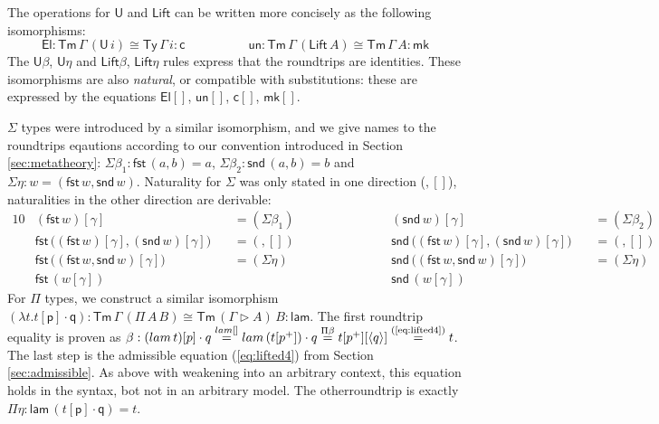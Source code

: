 \documentclass[a4paper,UKenglish,cleveref, autoref, thm-restate]{lipics-v2021}
\newcommand{\Ty}{\mathsf{Ty}}
\newcommand{\Tm}{\mathsf{Tm}}
\newcommand{\p}{\mathsf{p}}
\newcommand{\q}{\mathsf{q}}
\newcommand{\ext}{\mathop{\triangleright}}
\newcommand{\lam}{\mathsf{lam}}
\newcommand{\U}{\mathsf{U}}
\newcommand{\El}{\mathsf{El}}
\newcommand{\cd}{\mathsf{c}}
\newcommand{\fst}{\mathsf{fst}}
\newcommand{\snd}{\mathsf{snd}}
\newcommand{\Lift}{\mathsf{Lift}}
\newcommand{\mk}{\mathsf{mk}}
\newcommand{\un}{\mathsf{un}}
\begin{document}
The operations for $\U$ and $\Lift$ can be written more concisely as
the following isomorphisms:
\[
\El:\Tm\,\Gamma\,(\U\,i) \cong \Ty\,\Gamma\,i:\cd \hspace{5em} \un:\Tm\,\Gamma\,(\Lift\,A)\cong\Tm\,\Gamma\,A:\mk
\]
The $\U\beta$, $\U\eta$ and $\Lift\beta$, $\Lift\eta$ rules express
that the roundtrips are identities. These isomorphisms are also
\emph{natural}, or compatible with substitutions: these are expressed
by the equations $\El[]$, $\un[]$, $\cd[]$, $\mk[]$.

$\Sigma$ types were introduced by a similar isomorphism, and we give
names to the roundtrips eqautions according to our convention introduced in
Section \ref{sec:metatheory}: $\Sigma\beta_1 : \fst\,(a,b) = a$,
$\Sigma\beta_2 : \snd\,(a,b) = b$ and $\Sigma\eta : w =
(\fst\,w,\snd\,w)$. Naturality for $\Sigma$ was only stated in one
direction (${,}[]$), naturalities in the other direction are
derivable:
\begin{alignat*}{10}
  & (\fst\,w)[\gamma] && {=}(\Sigma\beta_1)                             && (\snd\,w)[\gamma] && {=}(\Sigma\beta_2)                             \\
  & \fst\,\big((\fst\,w)[\gamma],(\snd\,w)[\gamma]\big)\, && {=}({,}[]) \hspace{6em} && \snd\,\big((\fst\,w)[\gamma],(\snd\,w)[\gamma]\big)\, && {=}({,}[]) \\
  & \fst\,\big((\fst\,w,\snd\,w)[\gamma]\big) && {=}(\Sigma\eta)        && \snd\,\big((\fst\,w,\snd\,w)[\gamma]\big) && {=}(\Sigma\eta)        \\
  & \fst\,(w[\gamma])                                                && && \snd\,(w[\gamma])                                                   
\end{alignat*}
For $\Pi$ types, we construct a similar isomorphism
$
(\lambda t.t[\p]\cdot\q) : \Tm\,\Gamma\,(\Pi\,A\,B) \cong \Tm\,(\Gamma\ext A)\,B : \lam.
$
The first roundtrip equality is proven as
$\beta : (\lam\,t)[\p]\cdot\q \overset{\lam[]}{=} \lam\,(t[\p^+])\cdot\q \overset{\Pi\beta}{=} t[p^+][\langle\q\rangle] \overset{\text{(\ref{eq:lifted4})}}{=} t$.
The last step is the admissible equation (\ref{eq:lifted4}) from
Section \ref{sec:admissible}. As above with weakening into an
arbitrary context, this equation holds in the syntax, bot not in an
arbitrary model.
The otherroundtrip is exactly $\Pi\eta : \lam\,(t[\p]\cdot\q) = t$.
\end{document}
